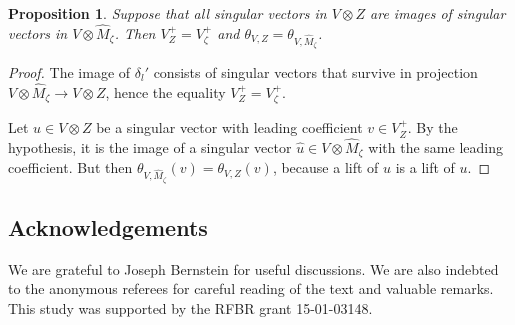 \documentclass[pdftex]{sigma}
\numberwithin{equation}{section}
\newtheorem{Proposition}[Theorem]{Proposition}
 { \theoremstyle{definition}
\newtheorem{Definition}[Theorem]{Definition}
\newtheorem{Example}[Theorem]{Example}
\newtheorem{Remark}[Theorem]{Remark} }
\begin{document}
\begin{Proposition}\label{ex_twist_lift}Suppose that all singular vectors in $V\otimes Z$ are images of singular vectors in $V\otimes \hat M_\zeta$. Then $V^+_Z= V^+_{\zeta}$ and $\theta_{V,Z}=\theta_{V,\hat M_\zeta}$.
 \end{Proposition}
\begin{proof} The image of $\delta_l'$ consists of singular vectors that survive in projection $V\otimes \hat M_\zeta\to V\otimes Z$, hence the equality $V^+_Z= V^+_{\zeta}$.

Let $u\in V\otimes Z$ be a singular vector with leading coefficient $v\in V^+_Z$. By the hypothesis, it is the image of a singular vector $\hat u\in V\otimes \hat M_\zeta$ with the same leading coefficient. But then $\theta_{V,\hat M_\zeta}(v)=\theta_{V,Z}(v)$, because a lift of $\hat u$ is a lift of $u$.
\end{proof}

\subsection*{Acknowledgements}

We are grateful to Joseph Bernstein for useful discussions. We are also indebted to the anonymous referees for careful reading of the text and valuable remarks. This study was supported by the RFBR grant 15-01-03148.
\end{document}
